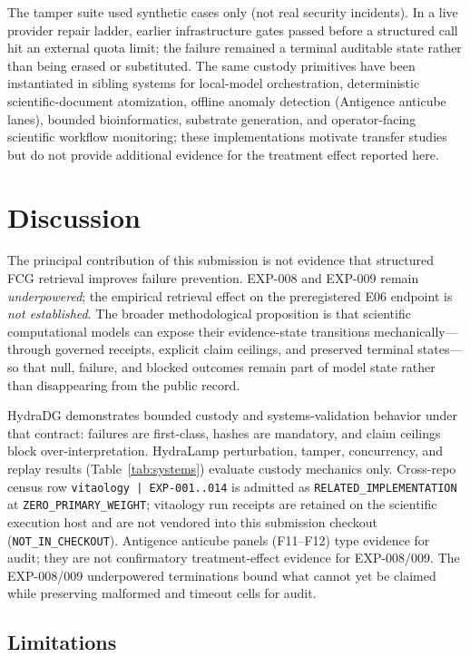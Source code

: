 \documentclass{article}
\begin{document}
The tamper suite used synthetic cases only (not real security incidents).
In a live provider repair ladder, earlier infrastructure gates passed before a structured call hit an external quota limit; the failure remained a terminal auditable state rather than being erased or substituted.
The same custody primitives have been instantiated in sibling systems for local-model orchestration, deterministic scientific-document atomization, offline anomaly detection (Antigence anticube lanes), bounded bioinformatics, substrate generation, and operator-facing scientific workflow monitoring; these implementations motivate transfer studies but do not provide additional evidence for the treatment effect reported here.

\section{Discussion}

The principal contribution of this submission is not evidence that structured FCG retrieval improves failure prevention.
EXP-008 and EXP-009 remain \emph{underpowered}; the empirical retrieval effect on the preregistered E06 endpoint is \emph{not established}.
The broader methodological proposition is that scientific computational models can expose their evidence-state transitions mechanically---through governed receipts, explicit claim ceilings, and preserved terminal states---so that null, failure, and blocked outcomes remain part of model state rather than disappearing from the public record.

HydraDG demonstrates bounded custody and systems-validation behavior under that contract: failures are first-class, hashes are mandatory, and claim ceilings block over-interpretation.
HydraLamp perturbation, tamper, concurrency, and replay results (Table~\ref{tab:systems}) evaluate custody mechanics only.
Cross-repo census row \texttt{vitaology | EXP-001..014} is admitted as \texttt{RELATED\_IMPLEMENTATION} at \texttt{ZERO\_PRIMARY\_WEIGHT}; vitaology run receipts are retained on the scientific execution host and are not vendored into this submission checkout (\texttt{NOT\_IN\_CHECKOUT}).
Antigence anticube panels (F11--F12) type evidence for audit; they are not confirmatory treatment-effect evidence for EXP-008/009.
The EXP-008/009 underpowered terminations bound what cannot yet be claimed while preserving malformed and timeout cells for audit.

\subsection{Limitations}
\label{sec:limitations}
\end{document}
